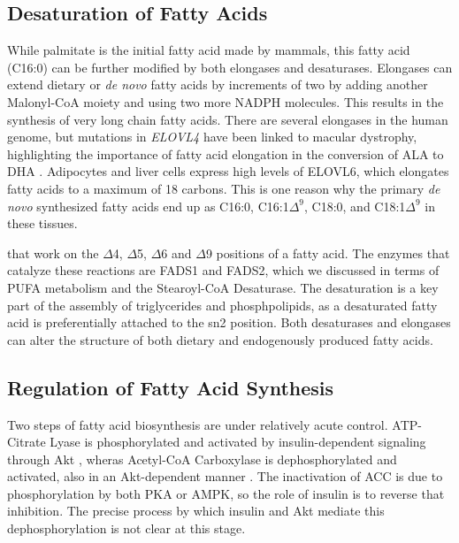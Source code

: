 \documentclass{tufte-handout}
\begin{document}
\subsection{Desaturation of Fatty Acids}

While palmitate is the initial fatty acid made by mammals, this fatty acid (C16:0) can be further modified by both elongases and desaturases.  Elongases can extend dietary or \textit{de novo} fatty acids by increments of two by adding another Malonyl-CoA moiety and using two more NADPH molecules.  This results in the synthesis of very long chain fatty acids.  There are several elongases in the human genome, but mutations in \textit{ELOVL4} have been linked to macular dystrophy, highlighting the importance of fatty acid elongation in the conversion of ALA to DHA \citep{Zhang2001}.  Adipocytes and liver cells express high levels of ELOVL6, which elongates fatty acids to a maximum of 18 carbons.  This is one reason why the primary \textit{de novo} synthesized fatty acids end up as C16:0, C16:1$\Delta^9$, C18:0, and C18:1$\Delta^9$ in these tissues.

 that work on the $\Delta$4, $\Delta$5, $\Delta$6 and $\Delta$9 positions of a fatty acid.  The enzymes that catalyze these reactions are FADS1 and FADS2, which we discussed in terms of PUFA metabolism and the Stearoyl-CoA Desaturase.  The desaturation is a key part of the assembly of triglycerides and phosphpolipids, as a desaturated fatty acid is preferentially attached to the sn2 position.  Both desaturases and elongases can alter the structure of both dietary and endogenously produced fatty acids.

\subsection{Regulation of Fatty Acid Synthesis}

Two steps of fatty acid biosynthesis are under relatively acute control.  ATP-Citrate Lyase is phosphorylated and activated by insulin-dependent signaling through Akt \citep{Berwick2002}, wheras Acetyl-CoA Carboxylase is dephosphorylated and activated, also in an Akt-dependent manner \citep{Witters1992}.  The inactivation of ACC is due to phosphorylation by both PKA or AMPK, so the role of insulin is to reverse that inhibition.  The precise process by which insulin and Akt mediate this dephosphorylation is not clear at this stage.  
\end{document}
